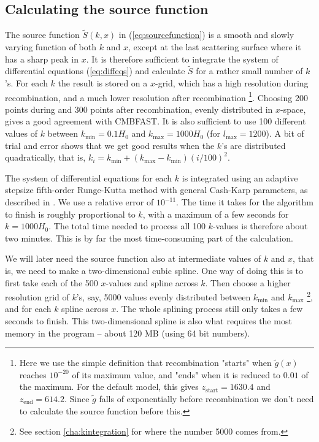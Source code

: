 \documentclass[twocolumn,nofootinbib,amsmath,amssymb]{revtex4}
\begin{document}
\subsection{Calculating the source function}
\label{cha:sourcefunction}

The source function $\tilde{S}(k,x)$ in (\ref{eq:sourcefunction}) is a smooth
and slowly varying function of both $k$ and $x$, except at the last scattering
surface where it has a sharp peak in $x$. It is therefore sufficient to
integrate the system of differential equations (\ref{eq:diffeqs}) and calculate
$\tilde{S}$ for a rather small number of $k$'s. For each $k$ the result is
stored on a $x$-grid, which has a high resolution during recombination, and a
much lower resolution after recombination \footnote{Here we use the simple
definition that recombination "starts" when $\tilde{g}(x)$ reaches $10^{-20}$
of its maximum value, and "ends" when it is reduced to $0.01$ of the maximum.
For the default model, this gives $z_{\mathrm{start}} = 1630.4$ and
$z_{\mathrm{end}} = 614.2$. Since $\tilde{g}$ falls of exponentially before
recombination we don't need to calculate the source function before this.}.
Choosing 200 points during and 300 points after recombination, evenly
distributed in $x$-space, gives a good agreement with CMBFAST. It is also
sufficient to use 100 different values of $k$ between $k_{\min} = 0.1 H_0$ and
$k_{\max} = 1000 H_0$ (for $l_{\max} = 1200$). A bit of trial and error shows
that we get good results when the $k$'s are distributed quadratically, that is,
$k_i = k_{\min} + (k_{\max} - k_{\min}) (i/100)^2$.

The system of differential equations for each $k$ is integrated using an
adaptive stepsize fifth-order Runge-Kutta method with general Cash-Karp
parameters, as described in \cite{NumRec}. We use a relative error of
$10^{-11}$. The time it takes for the algorithm to finish is roughly
proportional to $k$, with a maximum of a few seconds for $k = 1000 H_0$. The
total time needed to process all 100 $k$-values is therefore about two minutes.
This is by far the most time-consuming part of the calculation.

We will later need the source function also at intermediate values of $k$ and
$x$, that is, we need to make a two-dimensional cubic spline. One way of doing
this is to first take each of the 500 $x$-values and spline across $k$. Then
choose a higher resolution grid of $k$'s, say, 5000 values evenly distributed
between $k_{\min}$ and $k_{\max}$ \footnote{See section \ref{cha:kintegration}
for where the number 5000 comes from.}, and for each $k$ spline across $x$. The
whole splining process still only takes a few seconds to finish. This
two-dimensional spline is also what requires the most memory in the program --
about 120 MB (using 64 bit numbers).
\end{document}
